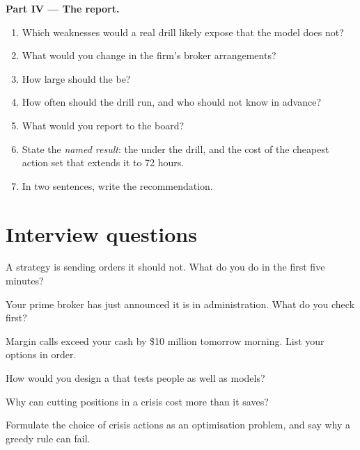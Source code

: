 \begin{problem}
\medskip\noindent\textbf{Part IV --- The report.}
\begin{enumerate}[resume]
\item Which weaknesses would a real drill likely expose that the model does not?
\item What would you change in the firm's broker arrangements?
\item How large should the  be?
\item How often should the drill run, and who should not know in advance?
\item What would you report to the board?
\item State the \emph{named result}: the  under the drill, and the cost of the cheapest action set that extends it to 72 hours.
\item In two sentences, write the recommendation.
\end{enumerate}
\end{problem}

\section{Interview questions}

\begin{interviewq}\label{iq:fm:crisis-management:1}
A strategy is sending orders it should not. What do you do in the first five minutes?
\end{interviewq}

\begin{interviewq}\label{iq:fm:crisis-management:2}
Your prime broker has just announced it is in administration. What do you check first?
\end{interviewq}

\begin{interviewq}\label{iq:fm:crisis-management:3}
Margin calls exceed your cash by \$10 million tomorrow morning. List your options in order.
\end{interviewq}

\begin{interviewq}\label{iq:fm:crisis-management:4}
How would you design a  that tests people as well as models?
\end{interviewq}

\begin{interviewq}\label{iq:fm:crisis-management:5}
Why can cutting positions in a crisis cost more than it saves?
\end{interviewq}

\begin{interviewq}\label{iq:fm:crisis-management:6}
Formulate the choice of crisis actions as an optimisation problem, and say why a greedy rule can fail.
\end{interviewq}
